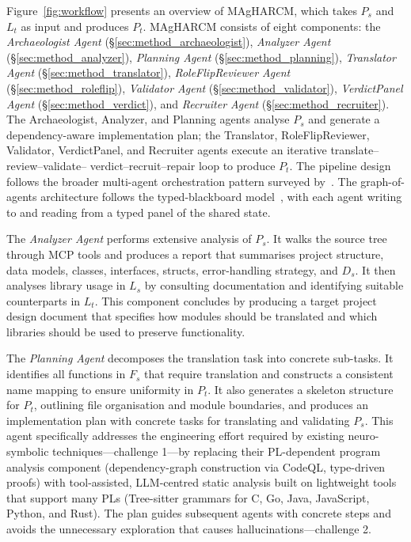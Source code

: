Figure~\ref{fig:workflow} presents an overview of MAgHARCM, which takes
$P_s$ and $L_t$ as input and produces $P_t$. MAgHARCM consists of eight
components: the \emph{Archaeologist Agent}
(§\ref{sec:method_archaeologist}), \emph{Analyzer Agent}
(§\ref{sec:method_analyzer}), \emph{Planning Agent}
(§\ref{sec:method_planning}), \emph{Translator Agent}
(§\ref{sec:method_translator}), \emph{RoleFlipReviewer Agent}
(§\ref{sec:method_roleflip}), \emph{Validator Agent}
(§\ref{sec:method_validator}), \emph{VerdictPanel Agent}
(§\ref{sec:method_verdict}), and \emph{Recruiter Agent}
(§\ref{sec:method_recruiter}). The Archaeologist, Analyzer, and Planning
agents analyse $P_s$ and generate a dependency-aware implementation
plan; the Translator, RoleFlipReviewer, Validator, VerdictPanel, and
Recruiter agents execute an iterative translate--review--validate--
verdict--recruit--repair loop to produce $P_t$.
The pipeline design follows the broader multi-agent orchestration pattern
surveyed by~\cite{p63_multi_agent_survey,p95_roziere_code_llama_2023,p93_rafailov_dpo_2023}. The graph-of-agents architecture follows the
typed-blackboard model~\cite{p73_nii_blackboard_1986}, with each agent writing to and reading
from a typed panel of the shared state.

The \emph{Analyzer Agent} performs extensive analysis of $P_s$. It walks
the source tree through MCP tools and produces a report that
summarises project structure, data models, classes, interfaces, structs,
error-handling strategy, and $D_s$. It then analyses library usage in
$L_s$ by consulting documentation and identifying suitable counterparts
in $L_t$. This component concludes by producing a target project design
document that specifies how modules should be translated and which
libraries should be used to preserve functionality.

The \emph{Planning Agent} decomposes the translation task into concrete
sub-tasks. It identifies all functions in $F_s$ that require
translation and constructs a consistent name mapping to ensure
uniformity in $P_t$. It also generates a skeleton structure for $P_t$,
outlining file organisation and module boundaries, and produces an
implementation plan with concrete tasks for translating and validating
$P_s$. This agent specifically addresses the engineering effort required
by existing neuro-symbolic techniques---challenge 1---by replacing their
PL-dependent program analysis component (dependency-graph construction
via CodeQL, type-driven proofs) with tool-assisted, LLM-centred static
analysis built on lightweight tools that support many PLs (Tree-sitter
grammars for C, Go, Java, JavaScript, Python, and Rust). The plan
guides subsequent agents with concrete steps and avoids the unnecessary
exploration that causes hallucinations---challenge 2.

